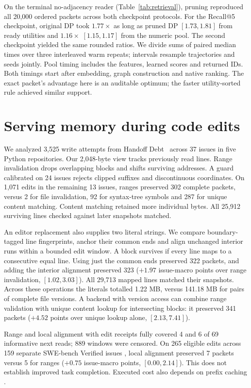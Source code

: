 \documentclass[conference]{IEEEtran}
\begin{document}
On the terminal no-adjacency reader (Table~\ref{tab:retrieval}), pruning reproduced all 20,000 ordered packets across both checkpoint protocols. For the Recall@5 checkpoint, original DP took $1.77\times$ as long as pruned DP $[1.73,1.81]$ from ready utilities and $1.16\times$ $[1.15,1.17]$ from the numeric pool. The second checkpoint yielded the same rounded ratios. We divide sums of paired median times over three interleaved warm repeats; intervals resample trajectories and seeds jointly. Pool timing includes the features, learned scores and returned IDs. Both timings start after embedding, graph construction and native ranking. The exact packet's advantage here is an auditable optimum; the faster utility-sorted rule achieved similar support.

\section{Serving memory during code edits}
We analyzed 3,525 write attempts from Handoff Debt~\cite{handoff} across 37 issues in five Python repositories. Our 2,048-byte view tracks previously read lines. Range invalidation drops overlapping blocks and shifts surviving addresses. A guard calibrated on 24 issues rejects clipped suffixes and discontinuous coordinates. On 1,071 edits in the remaining 13 issues, ranges preserved 302 complete packets, versus 2 for file invalidation, 92 for syntax-tree symbols and 287 for unique content matching. Content matching retained more individual bytes. All 25,912 surviving lines checked against later snapshots matched.

An editor replacement also supplies two literal strings. We compare boundary-tagged line fingerprints, anchor their common ends and align unchanged interior runs within a bounded edit window. A block survives if every line maps to a consecutive equal line. Using just the common ends preserved 322 packets, and adding the interior alignment preserved 323 ($+1.97$ issue-macro points over range invalidation, $[1.02,3.03]$). All 29,713 mapped lines matched their snapshots. Across these operations the literals totalled 1.22 MB, versus 141.18 MB for pairs of complete file versions. A backend with version access can combine range validation with unique content lookup for intersecting blocks: it preserved 341 packets ($+4.52$ points over unique lookup alone, $[2.13,7.41]$).

Range and local alignment with edit receipts fully covered 4 and 6 of 69 informative next reads; 889 windows were censored. On 265 eligible edits across 159 separate SWE-bench Verified issues \cite{swe-run}, local alignment preserved 7 packets versus 5 for ranges ($+0.75$ issue-macro points, $[0.00,2.14]$). This does not establish improved task completion. Executed cost also depends on prefix caching \cite{physical}.
\end{document}
